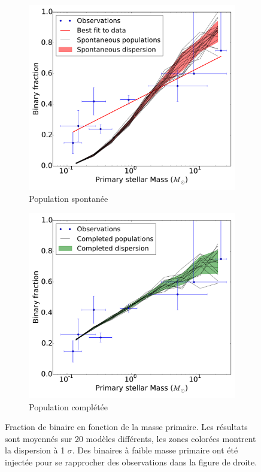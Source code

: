 \begin{figure}
\center
    \centering
    \begin{subfigure}[b]{0.48\textwidth}
    	\centering
        \includegraphics[width=\textwidth]{Figures/5_spontaneous_primarymass}
        \caption{Population spontan\'ee}
        \label{Fig:resume_spont}
    \end{subfigure}
    \begin{subfigure}[b]{0.48\textwidth}
        \includegraphics[width=\textwidth]{Figures/5_completed_primarymass}
        \caption{Population compl\'et\'ee}
        \label{Fig:resume_comp}
    \end{subfigure}
\caption{ Fraction de binaire en fonction de la masse primaire. Les r\'esultats sont moyenn\'es sur 20 mod\`eles diff\'erents, les zones color\'ees montrent la dispersion \`a 1 $\sigma$. Des binaires \`a faible masse primaire ont \'et\'e inject\'ee pour se rapprocher des observations dans la figure de droite.}
\label{Fig:resume_binpop}
\end{figure}


